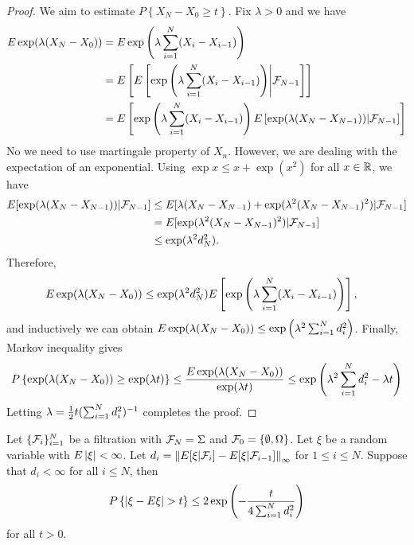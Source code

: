 \documentclass[a4paper]{article}
\begin{document}
\begin{proof}
  We aim to estimate $P \left\{ X_N - X_0 \geq t \right\}$.
  Fix $\lambda > 0$ and we have 
  \begin{align*}
    E \exp (\lambda (X_N - X_0))
    &= E \exp \left( \lambda \sum_{i=1}^N (X_i - X_{i - 1}) \right) \\
    &= E \left[ E \left[ \exp \left( \lambda \sum_{i=1}^N (X_i - X_{i - 1}) 
    \right) \middle|  \mathcal{F}_{N - 1} \right] \right] \\
    &= E \left[ \exp \left( \lambda \sum_{i=1}^N (X_i - X_{i - 1}) \right)
    E \left[ \exp (\lambda (X_N - X_{N - 1})) | \mathcal{F}_{N- 1} \right] \right]
  \end{align*}
  No we need to use martingale property of $X_n$. However, we 
  are dealing with the expectation of an exponential. Using 
  $\exp x \leq x + \exp (x^2)$ for all $x \in \mathbb{R}$, we have 
  \begin{align*}
    E [\exp (\lambda (X_N - X_{N - 1})) | \mathcal{F}_{N - 1}] 
    &\leq E [\lambda (X_N - X_{N - 1}) + \exp (\lambda^2 (X_N - X_{N - 1})^2) 
    | \mathcal{F}_{N - 1}] \\
    &= E [\exp (\lambda^2 (X_N - X_{N - 1})^2) | \mathcal{F}_{N - 1}] \\
    &\leq \exp (\lambda^2 d_N^2).
  \end{align*}
  Therefore,
  \begin{align*}
    E \exp (\lambda (X_N - X_0)) 
    &\leq \exp (\lambda^2 d_N^2) 
    E \left[ \exp \left( \lambda \sum_{i=1}^N (X_i - X_{i - 1}) \right) \right],
  \end{align*}
  and inductively we can obtain 
  $E \exp (\lambda (X_N - X_0)) \leq \exp \left( \lambda^2 \sum_{i=1}^N d_i^2 \right)$.
  Finally, Markov inequality gives 
  \[
  P \left\{ \exp (\lambda (X_N - X_0)) \geq \exp (\lambda t) \right\}
  \leq \frac{E \exp (\lambda (X_N - X_0))}{\exp (\lambda t)}
  \leq \exp \left( \lambda^2 \sum_{i=1}^N d_i^2 - \lambda t \right)
  \]
  Letting $\lambda = \frac{1}{2} t (\sum_{i=1}^N d_i^2)^{-1}$ completes the
  proof.

\end{proof}

\begin{cor}
  Let $\{ \mathcal{F}_i \}_{i=1}^N$ be a filtration with $\mathcal{F}_N = \Sigma$ and
  $\mathcal{F}_0 = \{ \emptyset, \Omega \}$.
  Let $\xi$ be a random variable with $E \left\lvert \xi\right\rvert < \infty$.
  Let $d_i = \left\lVert  E[\xi | \mathcal{F}_i] - E [\xi | \mathcal{F}_{i - 1}]\right\rVert_\infty$
  for $1 \leq i \leq N$. Suppose that $d_i < \infty$ for all 
  $i \leq N$, then 
  \[
  P \left\{ \left\lvert \xi - E \xi\right\rvert > t \right\}
  \leq 2 \exp \left( - \frac{t}{4 \sum_{i=1}^N d_i^2} \right)
  \]
  for all $t > 0$.
\end{cor}
\end{document}
